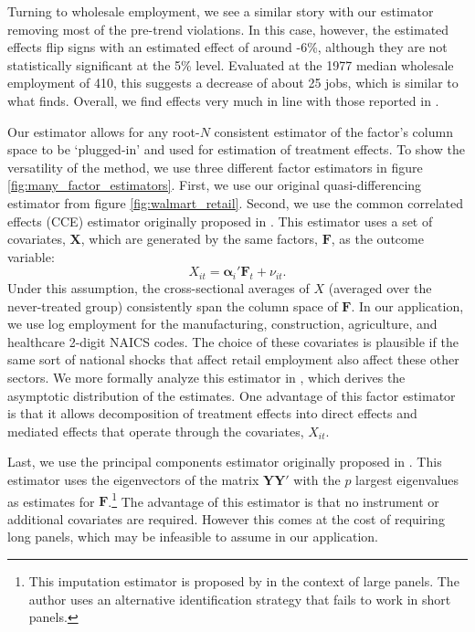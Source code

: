 Turning to wholesale employment, we see a similar story with our estimator removing most of the pre-trend violations. In this case, however, the estimated effects flip signs with an estimated effect of around -6\%, although they are not statistically significant at the 5\% level. Evaluated at the 1977 median wholesale employment of 410, this suggests a decrease of about 25 jobs, which is similar to what \citet{basker2005job} finds. Overall, we find effects very much in line with those reported in \citet{basker2005job}.

Our estimator allows for any root-$N$ consistent estimator of the factor's column space to be `plugged-in' and used for estimation of treatment effects. To show the versatility of the method, we use three different factor estimators in figure \ref{fig:many_factor_estimators}. First, we use our original quasi-differencing estimator from figure \ref{fig:walmart_retail}. Second, we use the common correlated effects (CCE) estimator originally proposed in \citet{pesaran2006estimation}. This estimator uses a set of covariates, $\bm X$, which are generated by the same factors, $\bm{F}$, as the outcome variable:
\begin{equation}
  X_{it} = \bm\alpha_i' \bm{F}_t + \nu_{it}.
\end{equation}
Under this assumption, the cross-sectional averages of $X$ (averaged over the never-treated group) consistently span the column space of $\bm{F}$.  In our application, we use log employment for the manufacturing, construction, agriculture, and healthcare 2-digit NAICS codes. The choice of these covariates is plausible if the same sort of national shocks that affect retail employment also affect these other sectors. We more formally analyze this estimator in \citet{Brown_Butts_Westerlund_2023}, which derives the asymptotic distribution of the estimates. One advantage of this factor estimator is that it allows decomposition of treatment effects into direct effects and mediated effects that operate through the covariates, $X_{it}$.

Last, we use the principal components estimator originally proposed in \citet{Bai_2009}. This estimator uses the eigenvectors  of the matrix $\bm Y \bm Y'$ with the $p$ largest eigenvalues as estimates for $\bm{F}$.\footnote{This imputation estimator is proposed by \citet{Xu_2017} in the context of large panels. The author uses an alternative identification strategy that fails to work in short panels.} The advantage of this estimator is that no instrument or additional covariates are required. However this comes at the cost of requiring long panels, which may be infeasible to assume in our application.


